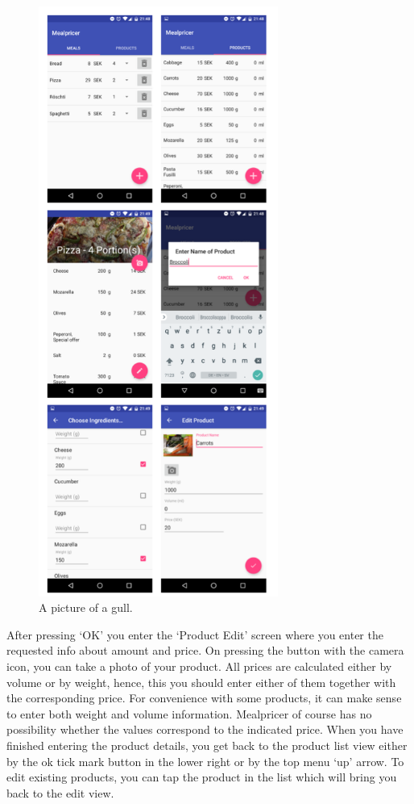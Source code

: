 \documentclass[a4paper,11pt,twoside]{article}
\begin{document}
\begin{figure}

  \centering
    \includegraphics[width=0.7\textwidth]{images/screenshots.png}
    \caption{A picture of a gull.}
    \label{fig:screenshots}
\end{figure}

After pressing `OK' you enter the `Product Edit' screen where
you enter the requested info about amount and price. On pressing the button with
the camera icon, you can take a photo of your product. All prices are calculated
either by volume or by weight, hence, this you should enter either of them together
with the corresponding price. For convenience with some products, it can make
sense to enter both weight and volume information. Mealpricer of course has no
possibility whether the values correspond to the indicated price. When you have
finished entering the product details, you get back to the product list view
either by the ok tick mark button in the lower right or by the top menu `up'
arrow. To edit existing products, you can tap the product in the list which
will bring you back to the edit view.
\end{document}
